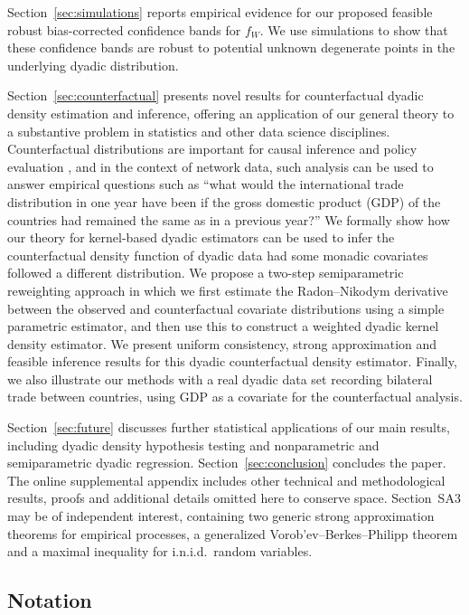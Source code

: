Section~\ref{sec:simulations} reports
empirical evidence for our proposed
feasible robust bias-corrected confidence bands for $f_W$.
We use simulations to show that these confidence bands are robust to potential
unknown degenerate points in the underlying dyadic distribution.

Section~\ref{sec:counterfactual} presents novel results for counterfactual
dyadic density estimation and inference,
offering an application of our general theory to a
substantive problem in statistics and other data science disciplines.
Counterfactual distributions are important for causal inference
and policy evaluation
\citep{dinardo1996distribution,chernozhukov2013inference},
and in the context of network data,
such analysis can be used to answer empirical questions
such as ``what would the international trade distribution in one year have been
if the gross domestic product (GDP) of the countries had
remained the same as in a previous year?''
We formally show how our theory for kernel-based dyadic estimators
can be used
to infer the counterfactual density function
of dyadic data had some monadic covariates followed a
different distribution.
We propose a two-step semiparametric reweighting approach in which we
first estimate the Radon--Nikodym derivative between the
observed and counterfactual
covariate distributions using a simple parametric estimator,
and then use this to construct a weighted dyadic kernel density estimator.
We present uniform consistency, strong approximation
and feasible inference results
for this dyadic counterfactual density estimator.
Finally, we also illustrate our methods
with a real dyadic data set recording bilateral trade between countries,
using GDP as a covariate for the counterfactual analysis.

Section~\ref{sec:future} discusses further statistical
applications of our main results,
including dyadic density hypothesis testing and nonparametric
and semiparametric dyadic regression.
Section~\ref{sec:conclusion} concludes the paper.
The online supplemental appendix includes other technical and methodological
results, proofs and additional details omitted here to conserve space.
Section~SA3 may be of independent interest, containing
two generic strong approximation theorems for empirical processes,
a generalized Vorob'ev--Berkes--Philipp theorem
and a maximal inequality for i.n.i.d.\ random variables.

\subsection{Notation}

